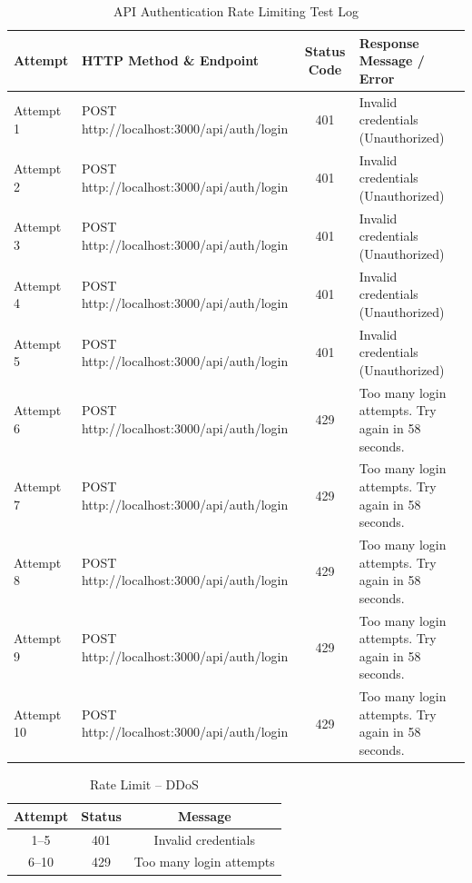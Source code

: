 \begin{table}[H]
\centering
\caption{API Authentication Rate Limiting Test Log}
\label{tab:api-rate-limit-log}
\begin{tabularx}{\textwidth}{l l c X}
\toprule
\textbf{Attempt} & \textbf{HTTP Method \& Endpoint} & \textbf{Status Code} & \textbf{Response Message / Error} \\
\midrule
Attempt 1  & POST http://localhost:3000/api/auth/login & 401 & Invalid credentials (Unauthorized) \\
Attempt 2  & POST http://localhost:3000/api/auth/login & 401 & Invalid credentials (Unauthorized) \\
Attempt 3  & POST http://localhost:3000/api/auth/login & 401 & Invalid credentials (Unauthorized) \\
Attempt 4  & POST http://localhost:3000/api/auth/login & 401 & Invalid credentials (Unauthorized) \\
Attempt 5  & POST http://localhost:3000/api/auth/login & 401 & Invalid credentials (Unauthorized) \\
Attempt 6  & POST http://localhost:3000/api/auth/login & 429 & Too many login attempts. Try again in 58 seconds. \\
Attempt 7  & POST http://localhost:3000/api/auth/login & 429 & Too many login attempts. Try again in 58 seconds. \\
Attempt 8  & POST http://localhost:3000/api/auth/login & 429 & Too many login attempts. Try again in 58 seconds. \\
Attempt 9  & POST http://localhost:3000/api/auth/login & 429 & Too many login attempts. Try again in 58 seconds. \\
Attempt 10 & POST http://localhost:3000/api/auth/login & 429 & Too many login attempts. Try again in 58 seconds. \\
\bottomrule
\end{tabularx}
\end{table}

\begin{table}[H]
    \centering
    \caption{Rate Limit -- DDoS}
    \begin{tabular}{ccc}
    \toprule
    \textbf{Attempt} & \textbf{Status} & \textbf{Message}\\
    \midrule
    1--5 & 401 & Invalid credentials\\
    6--10 & 429 & Too many login attempts\\
    \bottomrule
    \end{tabular}
\end{table}


